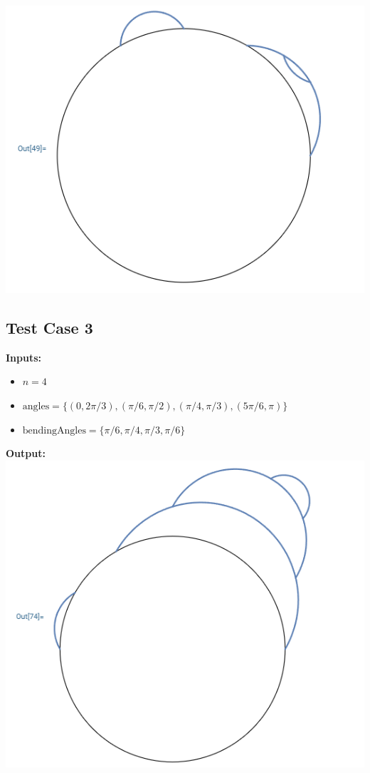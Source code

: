 \documentclass[a4paper,12pt]{article}
\begin{document}
{\centering
\includegraphics[height = 0.4\textheight]{Test 2.png}\\
}\par

\subsection*{Test Case 3}
\textbf{Inputs:}
\begin{itemize}
    \item \( n = 4 \)
    \item \( \text{angles} = \{(0, 2\pi/3), (\pi/6, \pi/2), (\pi/4, \pi/3), (5\pi/6, \pi)\} \)
    \item \( \text{bendingAngles} = \{\pi/6, \pi/4, \pi/3, \pi/6\} \)
\end{itemize}
\textbf{Output:}\\

{\centering
\includegraphics[height = 0.37\textheight]{Test 3.png}\\
}\par
\end{document}
